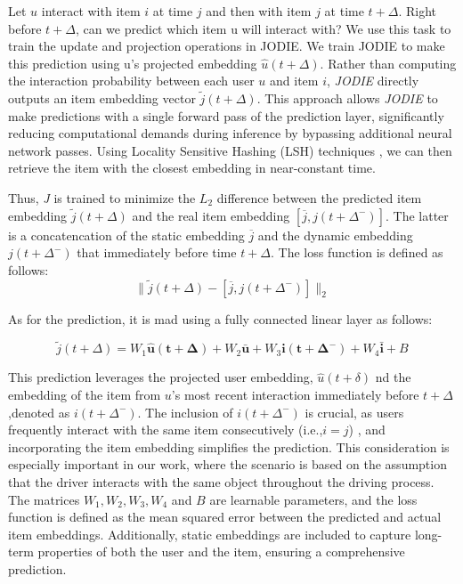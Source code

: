 Let $u$ interact with item $i$ at time $j$ and then with item $j$ at time $t + \Delta$. Right before $t + \Delta$, can we predict which item u will interact with? We use this task to train the update and projection operations in JODIE. We train JODIE to make this prediction using u’s projected embedding $ \hat{u}(t+ \Delta)$. Rather than computing the interaction probability between each user $u$ and item $i$, \textit{JODIE} directly outputs an item embedding vector $\tilde{j}(t + \Delta)$. This approach allows \textit{JODIE} to make predictions with a single forward pass of the prediction layer, significantly reducing computational demands during inference by bypassing additional neural network passes. Using Locality Sensitive Hashing (LSH) techniques \cite{rajaraman2011mining}, we can then retrieve the item with the closest embedding in near-constant time.

Thus, \textit{J} is trained to minimize the $L_2$ difference between the predicted item embedding $\tilde{j}(t + \Delta)$ and the real item embedding $[\overline{j}, j(t + \Delta^-)]$. The latter is a concatencation of the static embedding $\overline{j}$ and the dynamic embedding $j(t + \Delta^-)$ that immediately before time $t+\Delta$. The loss function is defined as follows:
\[ \| \tilde{j}(t + \Delta) - [\overline{j}, j(t + \Delta^-)] \|_2 \]

As for the prediction, it is mad using a fully connected linear layer as follows:

\[\tilde{j}(t+\Delta)=W_1\mathbf{\hat{u}(t+\Delta)}+W_2\mathbf{\bar{u}}+W_3\mathbf{i(t+\Delta ^-)}+W_4\mathbf{\bar{i}}+B\]

This prediction leverages the projected user embedding, $\hat{u}(t+\delta)$ nd the embedding of the item from $u$'s most recent interaction immediately before $t+\Delta$,denoted as $i(t+\Delta ^-)$. The inclusion of $i(t+\Delta ^-)$ is crucial, as users frequently interact with the same item consecutively (i.e.,$i=j$) , and incorporating the item embedding simplifies the prediction. This consideration is especially important in our work, where the scenario is based on the assumption that the driver interacts with the same object throughout the driving process. The matrices $W_1,W_2,W_3,W_4$ and $B$ are learnable parameters, and the loss function is defined as the mean squared error between the predicted and actual item embeddings. Additionally, static embeddings are included to capture long-term properties of both the user and the item, ensuring a comprehensive prediction.

